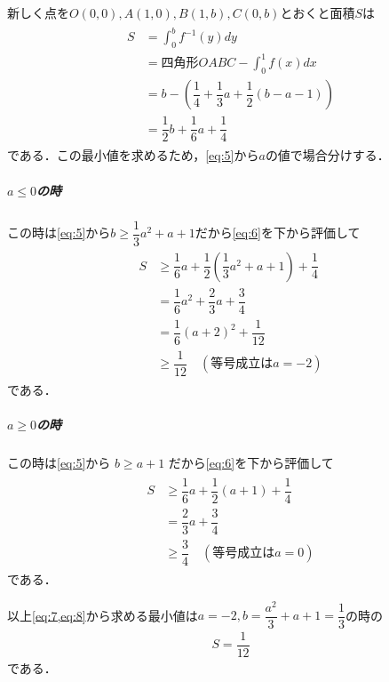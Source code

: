 \documentclass[../../main.tex]{subfiles}
\begin{document}
新しく点を$O(0,0), A(1,0), B(1,b), C(0,b)$とおくと面積$S$は
\begin{align}
  \begin{split}
    S
    &= \int_{0}^{b}f^{-1}(y) dy \\
    &=\text{四角形} OABC-\int_0^1f(x)dx \\
    &=b-\left(\dfrac{1}{4}+\dfrac{1}{3}a+\dfrac{1}{2}(b-a-1)\right) \\
    &=\dfrac{1}{2}b+\dfrac{1}{6}a+\dfrac{1}{4}
  \end{split} \label{eq:6}
\end{align}
である．この最小値を求めるため，\cref{eq:5}から$a$の値で場合分けする．

\subparagraph{$a\le0$の時}

この時は\cref{eq:5}から$b\ge\dfrac{1}{3}a^2+a+1$だから\cref{eq:6}を下から評価して
\begin{align}
  \begin{split}
    S
    &\ge \dfrac{1}{6}a+\dfrac{1}{2}\left(\dfrac{1}{3}a^2+a+1\right)+\dfrac{1}{4} \\
    &=\dfrac{1}{6}a^2+\dfrac{2}{3}a+\dfrac{3}{4} \\
    &=\dfrac{1}{6}(a+2)^2+\dfrac{1}{12} \\
    &\ge\dfrac{1}{12} \quad(\text{等号成立は}a=-2)
  \end{split} \label{eq:7}
\end{align}
である．

\subparagraph{$a\ge0$の時}

この時は\cref{eq:5}から $b\ge a+1$ だから\cref{eq:6}を下から評価して
\begin{align}
  \begin{split}
    S
    &\ge \dfrac{1}{6}a+\dfrac{1}{2}(a+1)+\dfrac{1}{4} \\
    &=\dfrac{2}{3}a+\dfrac{3}{4} \\
    &\ge\dfrac{3}{4} \quad(\text{等号成立は}a=0)
  \end{split} \label{eq:8}
\end{align}
である．
\casesend

以上\cref{eq:7,eq:8}から求める最小値は$a=-2, b=\dfrac{a^2}{3}+a+1=\dfrac{1}{3}$の時の
\begin{align}
  S=\dfrac{1}{12}
\end{align}
である．

\newpage
\end{document}

